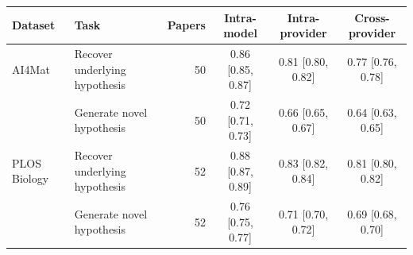 \begin{tabular}{llrccc}
\toprule
Dataset & Task & Papers & Intra-model & Intra-provider & Cross-provider \\
\midrule
AI4Mat & Recover underlying hypothesis & 50 & 0.86 {\scriptsize [0.85, 0.87]} & 0.81 {\scriptsize [0.80, 0.82]} & 0.77 {\scriptsize [0.76, 0.78]} \\
 & Generate novel hypothesis & 50 & 0.72 {\scriptsize [0.71, 0.73]} & 0.66 {\scriptsize [0.65, 0.67]} & 0.64 {\scriptsize [0.63, 0.65]} \\
\addlinespace
PLOS Biology & Recover underlying hypothesis & 52 & 0.88 {\scriptsize [0.87, 0.89]} & 0.83 {\scriptsize [0.82, 0.84]} & 0.81 {\scriptsize [0.80, 0.82]} \\
 & Generate novel hypothesis & 52 & 0.76 {\scriptsize [0.75, 0.77]} & 0.71 {\scriptsize [0.70, 0.72]} & 0.69 {\scriptsize [0.68, 0.70]} \\
\bottomrule
\end{tabular}
